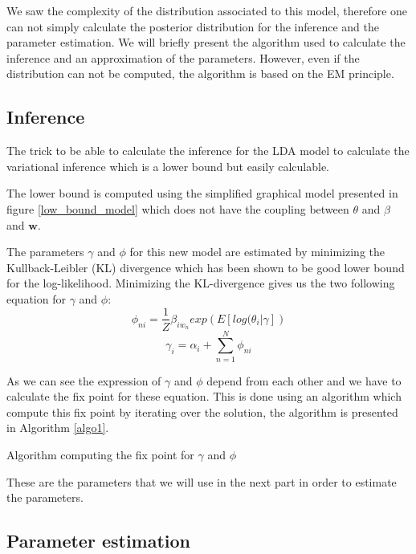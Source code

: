 We saw the complexity of the distribution associated to this model, therefore one can not simply calculate the posterior distribution for the inference and the parameter estimation. We will briefly present the algorithm used to calculate the inference and an approximation of the parameters. However, even if the distribution can not be computed, the algorithm is based on the EM principle.

\subsection{Inference}

The trick to be able to calculate the inference for the LDA model to calculate the variational inference which is a lower bound but easily calculable.

The lower bound is computed using the simplified graphical model presented in figure \ref{low_bound_model} which does not have the coupling between $\theta$ and $\beta$ and $\textbf{w}$.

The parameters $\gamma$ and $\phi$ for this new model are estimated by minimizing the Kullback-Leibler (KL) divergence which has been shown to be good lower bound for the log-likelihood. 
Minimizing the KL-divergence gives us the two following equation for $\gamma$ and $\phi$:
\[\phi_{ni} = \frac{1}{Z} \beta_{i w_n} exp\left( E[log(\theta_i | \gamma] \right)\]
\[\gamma_i = \alpha_i + \sum_{n=1}^{N} \phi_{ni}\]

As we can see the expression of $\gamma$ and $\phi$ depend from each other and we have to calculate the fix point for these equation. This is done using an algorithm which compute this fix point by iterating over the solution, the algorithm is presented in Algorithm \ref{algo1}. 


 \begin{algorithm}[H]
 \caption{Algorithm computing the fix point for $\gamma$ and $\phi$}
 \label{algo1}
\end{algorithm}

These are the parameters that we will use in the next part in order to estimate the parameters. 

\subsection{Parameter estimation}

